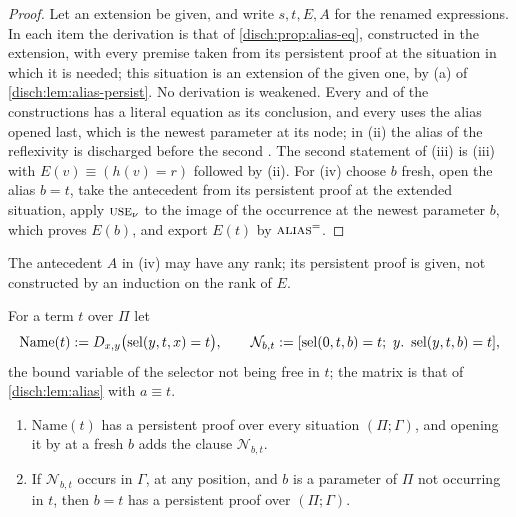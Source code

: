 \begin{proof}
Let an extension be given, and write $s,t,E,A$ for the renamed expressions.
In each item the derivation is that of \cref{disch:prop:alias-eq},
constructed in the extension, with every premise taken from its persistent
proof at the situation in which it is needed; this situation is an
extension of the given one, by (a) of \cref{disch:lem:alias-persist}. No
derivation is weakened. Every  and  of the
constructions has a literal equation as its conclusion, and every
 uses the alias opened last, which is the newest parameter
at its node; in (ii) the alias of the reflexivity is discharged before the
second . The second statement of (iii) is (iii) with
$E(v)\equiv(h(v)=r)$ followed by (ii). For (iv) choose $b$ fresh, open the
alias $b=t$, take the antecedent from its persistent proof at the extended
situation, apply $\rulename{Use}_{\nu}$ to the image of the occurrence at
the newest parameter $b$, which proves $E(b)$, and export $E(t)$ by
$\rulename{Alias}^{=}$.
\end{proof}

The antecedent $A$ in (iv) may have any rank; its persistent proof is
given, not constructed by an induction on the rank of $E$.

\begin{lemma}[Names]
\label{disch:lem:alias-name}
For a term $t$ over $\Pi$ let
\[
 \mathrm{Name}(t)\mathrel{:=}D_{x,y}\bigl(\operatorname{sel}(y,t,x)=t\bigr),\qquad
 \mathcal N_{b,t}\mathrel{:=}[\operatorname{sel}(0,t,b)=t;\ y.\ \operatorname{sel}(y,t,b)=t],
\]
the bound variable of the selector not being free in $t$; the matrix is
that of \cref{disch:lem:alias} with $a\equiv t$.
\begin{enumerate}[label=\textup{(\alph*)}]
\item $\mathrm{Name}(t)$ has a persistent proof over every situation
 $(\Pi;\Gamma)$, and opening it by  at a fresh $b$ adds the
 clause $\mathcal N_{b,t}$.
\item If $\mathcal N_{b,t}$ occurs in $\Gamma$, at any position, and $b$ is
 a parameter of $\Pi$ not occurring in $t$, then $b=t$ has a persistent
 proof over $(\Pi;\Gamma)$.
\end{enumerate}
\end{lemma}

